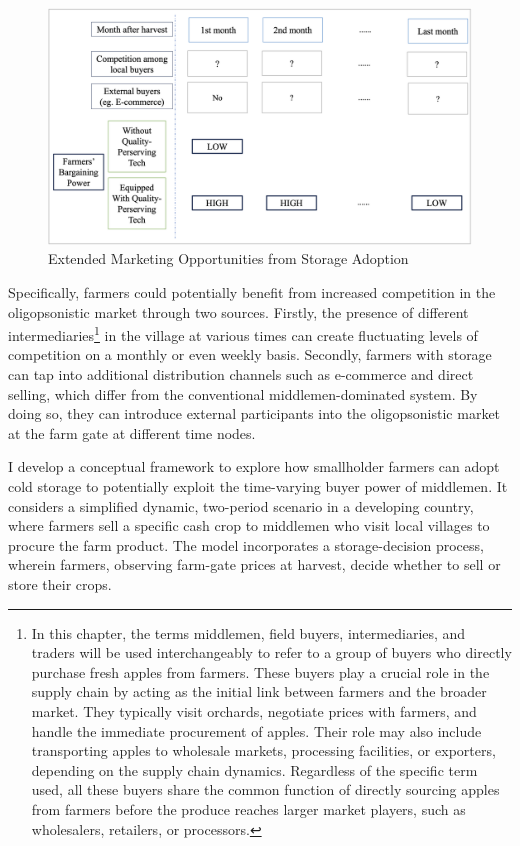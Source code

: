 \begin{figure}[ht!]
\centering
\includegraphics[width=1\textwidth]{figures/graphic_demo.png}
\caption{Extended Marketing Opportunities from Storage Adoption}
\label{Figure: Demo}
\end{figure}

Specifically, farmers could potentially benefit from increased competition in the oligopsonistic market through two sources. Firstly, the presence of different intermediaries\footnote{In this chapter, the terms middlemen, field buyers, intermediaries, and traders will be used interchangeably to refer to a group of buyers who directly purchase fresh apples from farmers. These buyers play a crucial role in the supply chain by acting as the initial link between farmers and the broader market. They typically visit orchards, negotiate prices with farmers, and handle the immediate procurement of apples. Their role may also include transporting apples to wholesale markets, processing facilities, or exporters, depending on the supply chain dynamics. Regardless of the specific term used, all these buyers share the common function of directly sourcing apples from farmers before the produce reaches larger market players, such as wholesalers, retailers, or processors.} in the village at various times can create fluctuating levels of competition on a monthly or even weekly basis. Secondly, farmers with storage can tap into additional distribution channels such as e-commerce and direct selling, which differ from the conventional middlemen-dominated system. By doing so, they can introduce external participants into the oligopsonistic market at the farm gate at different time nodes. 

I develop a conceptual framework to explore how smallholder farmers can adopt cold storage to potentially exploit the time-varying buyer power of middlemen. It considers a simplified dynamic, two-period scenario in a developing country, where farmers sell a specific cash crop to middlemen who visit local villages to procure the farm product. The model incorporates a storage-decision process, wherein farmers, observing farm-gate prices at harvest, decide whether to sell or store their crops.

